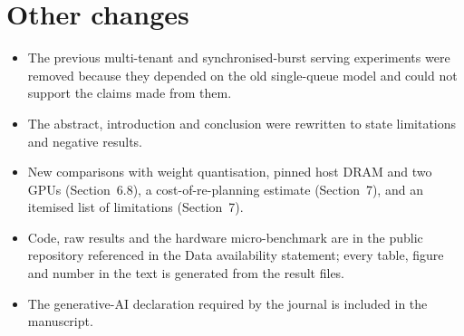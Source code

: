 \documentclass[11pt]{article}
\begin{document}
\section*{Other changes}
\begin{itemize}[nosep]
\item The previous multi-tenant and synchronised-burst serving experiments were removed because they depended on the old single-queue model and could not support the claims made from them.
\item The abstract, introduction and conclusion were rewritten to state limitations and negative results.
\item New comparisons with weight quantisation, pinned host DRAM and two GPUs (Section~6.8), a cost-of-re-planning estimate (Section~7), and an itemised list of limitations (Section~7).
\item Code, raw results and the hardware micro-benchmark are in the public repository referenced in the Data availability statement; every table, figure and number in the text is generated from the result files.
\item The generative-AI declaration required by the journal is included in the manuscript.
\end{itemize}
\end{document}
